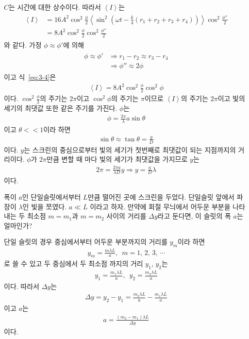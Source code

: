 \documentclass[tightenlines,floatfix,nofootinbib,superscriptaddress,fleqn]{revtex4}
\begin{document}
$C$는 시간에 대한 상수이다. 따라서 $\left<I\right>$는
\begin{align}\label{eq:3-4}
  \begin{split}
    \left<I\right> &= 16A^2\cos^2\frac{\phi}{2}
    \left<\sin^2\left(\omega t-\frac{k}{4}(r_1+r_2+r_3+r_4)\right)\right>
    \cos^2\frac{\phi''}{2}  \\
    &=8A^2\cos^2\frac{\phi}{2}\cos^2\frac{\phi''}{2}
  \end{split}
\end{align}
와 같다. 가정 $\phi \approx \phi'$에 의해 
\begin{align}
  \begin{split}
    \phi \approx \phi' &\Longrightarrow
    r_1-r_2 \approx r_3-r_4 \\
    &\Longrightarrow
    \phi'' \approx 2\phi
  \end{split}
\end{align}
이고 식~\eqref{eq:3-4}은
\begin{align}
  \left<I\right> = 8A^2\cos^2\frac{\phi}{2}\cos^2\phi
\end{align}
이다. $\cos^2\frac{\phi}{2}$의 주기는 $2\pi$이고 $\cos^2\phi$의 주기는 $\pi$이므로
$\left<I\right>$의 주기는 $2\pi$이고 빛의 세기의 최댓값 또한 같은 주기를 가진다. $\phi$는
\begin{align}
  \phi = \frac{2\pi}{\lambda}a\sin\theta
\end{align}
이고 $\theta<<1$이라 하면 
\begin{align}
  \sin\theta\approx\tan\theta=\frac{y}{D}
\end{align}
이다. $y$는 스크린의 중심으로부터 빛의 세기가 첫번째로 최댓값이 되는 지점까지의 거리이다.
$\phi$가 $2\pi$만큼 변할 때 마다 빛의 세기가 최댓값을 가지므로 $y$는
\begin{align}
  2\pi = \frac{2\pi a }{\lambda D} y
  \Longrightarrow y = \frac{a}{D}\lambda
\end{align}
이다.
\vspace{1cm}

폭이 $a$인 단일슬릿에서부터 $L$만큼 떨어진 곳에 스크린을
두었다. 단일슬릿 앞에서 파장이 $\lambda$인 빛을 쪼였다. $a\ll L$
이라고 하자. 만약에 회절 무늬에서 어두운 부분을 나타내는 두 최소점
$m=m_1$과 $m=m_2$ 사이의 거리를 $\Delta y$라고 둔다면, 이 슬릿의 폭
$a$는 얼마인가? 

단일 슬릿의 경우 중심에서부터 어두운 부분까지의 거리를 $y_m$이라 하면
\begin{align}
  y_m = \frac{m\lambda L}{a},\,\,\,m=1,\,2,\,3,\,\cdots
\end{align}
로 쓸 수 있고 두 중심에서 두 최소점 까지의 거리 $y_1$, $y_2$는
\begin{align}
  y_1=\frac{m_1\lambda L}{a} ,\,\,\,y_2=\frac{m_2\lambda L}{a}
\end{align}
이다. 따라서 $\Delta y$는
\begin{align}
  \Delta y = y_2-y_1 = \frac{m_2\lambda L}{a} - \frac{m_1\lambda L}{a}
\end{align}
이고 $a$는
\begin{align}
  a = \frac{(m_2-m_1)\lambda L}{\Delta y}
\end{align}
이다.
\vspace{1cm}
\end{document}
